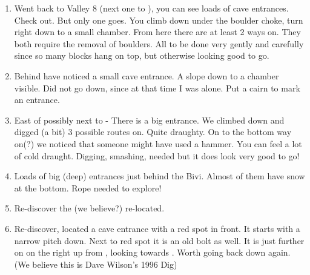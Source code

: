 \begin{enumerate}
\def\labelenumi{\arabic{enumi}.}
\item
  Went back to Valley 8 (next one to ), you can see loads of cave
  entrances. Check out. But only one goes. You climb down under the
  boulder choke, turn right down to a small chamber. From here there are
  at least 2 ways on. They both require the removal of boulders. All to
  be done very gently and carefully since so many blocks hang on top,
  but otherwise looking good to go.
\item
  Behind  have noticed a small cave entrance. A slope down to a
  chamber visible. Did not go down, since at that time I was alone. Put
  a cairn to mark an entrance.
\item
  East of  possibly next to  - There is a big
  entrance. We climbed down and digged (a bit) 3 possible routes on.
  Quite draughty. On to the bottom way on(?) we noticed that someone
  might have used a hammer. You can feel a lot of cold draught. Digging,
  smashing, needed but it does look very good to go!
\item
  Loads of big (deep) entrances just behind the Bivi. Almost of them
  have snow at the bottom. Rope needed to explore!
\item
  Re-discover the  (we believe?) re-located.
\item
  Re-discover, located a cave entrance with a red spot in front. It
  starts with a narrow pitch down. Next to red spot it is an old bolt as
  well. It is just further on on the right up from ,
  looking towards . Worth going back down again. (We believe this
  is Dave Wilson's 1996 Dig)
\end{enumerate}


